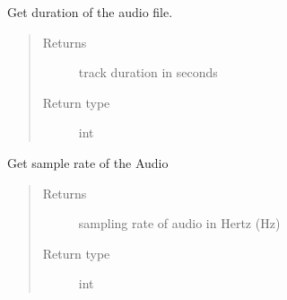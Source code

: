 \documentclass[letterpaper,10pt,english,openany,oneside]{sphinxmanual}
\begin{document}
\begin{fulllineitems}
\begin{fulllineitems}
\label{\detokenize{docs/source/preprocess:preprocess.track_classes.Audio.duration}}
Get duration of the audio file.
\begin{quote}\begin{description}
\item[{Returns}] \leavevmode
track duration in seconds

\item[{Return type}] \leavevmode
int

\end{description}\end{quote}

\end{fulllineitems}


\begin{fulllineitems}
\label{\detokenize{docs/source/preprocess:preprocess.track_classes.Audio.sr}}
Get sample rate of the Audio
\begin{quote}\begin{description}
\item[{Returns}] \leavevmode
sampling rate of audio in Hertz (Hz)

\item[{Return type}] \leavevmode
int

\end{description}\end{quote}

\end{fulllineitems}


\end{fulllineitems}

\end{document}
